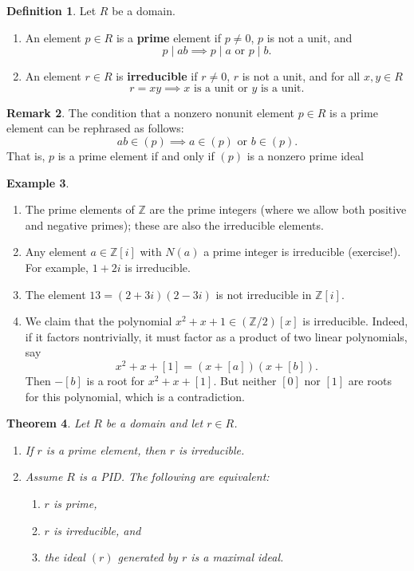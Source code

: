 \documentclass[12pt]{report}
\newtheorem{theorem}{Theorem}[chapter]
\numberwithin{equation}{section}
\numberwithin{theorem}{chapter}
\theoremstyle{definition}
\newtheorem{definition}[theorem]{Definition}
\newtheorem{example}[theorem]{Example}
\newtheorem*{basic properties}{Basic Properties}
\newtheorem*{Important Remark}{Important Remark}
\newtheorem{remark}[theorem]{Remark}
\begin{document}
\begin{definition} 
Let $R$ be a domain.
\begin{enumerate}
\item An element $p \in R$ is a {\bf prime} element if $p \neq 0$, $p$ is not a unit,  and 
  $$
  p \mid ab \implies p \mid a \text{ or } p \mid b.
  $$
\item An element $r \in R$ is {\bf irreducible} if $r\neq 0$, $r$ is not a unit, and for all $x,y \in R$
  $$
  r = xy \implies x \text{ is a unit or } y \text{ is a unit}.
  $$
\end{enumerate}
\end{definition}



\begin{remark}
The condition that a nonzero nonunit element $p \in R$ is a prime element can be rephrased as follows: 
$$ab \in (p) \implies a \in (p) \text{ or } b \in (p).$$
That is, $p$ is a prime element if and only if $(p)$ is a nonzero prime ideal 
\end{remark}


\begin{example}$\,$
\begin{enumerate}
\item The prime elements of $\mathbb{Z}$ are the prime integers (where we allow both positive and negative primes); these are also the irreducible elements.
\item Any element $a \in \mathbb{Z}[i]$ with $N(a)$ a prime integer is irreducible (exercise!). For example, $1+2i$ is irreducible.
\item The element $13=(2+3i)(2-3i)$ is not irreducible in $\mathbb{Z}[i]$.
\item We claim that the polynomial $x^2+x+1 \in (\mathbb{Z}/2)[x]$ is irreducible. Indeed, if it factors nontrivially, it must factor as a product of two linear polynomials, say 
$$x^2+x+[1]=(x+[a])(x+[b]).$$ 
Then $-[b]$ is a root for $x^2+x+[1]$. But neither $[0]$ nor $[1]$ are roots for this polynomial, which is a contradiction.
\end{enumerate}
 \end{example}
 

\begin{theorem}\label{domain prime irreducible elements}
Let $R$ be a domain and let $r\in R$. 
\begin{enumerate}
\item If $r$ is a prime element, then $r$ is irreducible. 
\item Assume $R$ is a PID. The following are equivalent:
  \begin{enumerate}
  \item $r$ is prime,
  \item $r$ is irreducible, and
    \item the ideal $(r)$ generated by $r$ is a maximal ideal.
    \end{enumerate}
    \end{enumerate}
\end{theorem}
\end{document}
